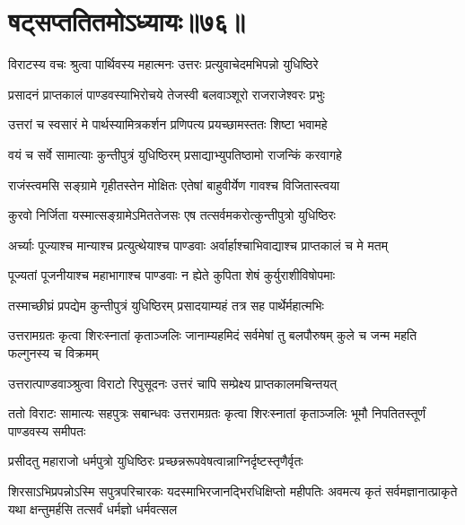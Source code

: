 \chapter{षट्सप्ततितमोऽध्यायः॥७६॥}

\twolineshloka
{विराटस्य वचः श्रुत्वा पार्थिवस्य महात्मनः}
{उत्तरः प्रत्युवाचेदमभिपन्नो युधिष्ठिरे}


\twolineshloka
{प्रसादनं प्राप्तकालं पाण्डवस्याभिरोचये}
{तेजस्वी बलवाञ्शूरो राजराजेश्वरः प्रभुः}


\twolineshloka
{उत्तरां च स्वसारं मे पार्थस्यामित्रकर्शन}
{प्रणिपत्य प्रयच्छामस्ततः शिष्टा भवामहे}



\twolineshloka
{वयं च सर्वे सामात्याः कुन्तीपुत्रं युधिष्ठिरम्}
{प्रसाद्याभ्युपतिष्ठामो राजन्किं करवागहे}


\twolineshloka
{राजंस्त्वमसि सङ्ग्रामे गृहीतस्तेन मोक्षितः}
{एतेषां बाहुवीर्येण गावश्च विजितास्त्वया}


\twolineshloka
{कुरवो निर्जिता यस्मात्सङ्ग्रामेऽमिततेजसः}
{एष तत्सर्वमकरोत्कुन्तीपुत्रो युधिष्ठिरः}


\twolineshloka
{अर्च्याः पूज्याश्च मान्याश्च प्रत्युत्थेयाश्च पाण्डवाः}
{अर्वार्हाश्चाभिवाद्याश्च प्राप्तकालं च मे मतम्}


\twolineshloka
{पूज्यतां पूजनीयाश्च महाभागाश्च पाण्डवाः}
{न ह्येते कुपिता शेषं कुर्युराशीविषोपमाः}


\twolineshloka
{तस्माच्छीघ्रं प्रपद्येम कुन्तीपुत्रं युधिष्ठिरम्}
{प्रसादयाम्यहं तत्र सह पार्थेर्महात्मभिः}


\threelineshloka
{उत्तरामग्रतः कृत्वा शिरःस्नातां कृताञ्जलिः}
{जानाम्यहमिदं सर्वमेषां तु बलपौरुषम्}
{कुले च जन्म महति फल्गुनस्य च विक्रमम्}




\twolineshloka
{उत्तरात्पाण्डवाञ्श्रुत्वा विराटो रिपुसूदनः}
{उत्तरं चापि सम्प्रेक्ष्य प्राप्तकालमचिन्तयत्}


\threelineshloka
{ततो विराटः सामात्यः सहपुत्रः सबान्धवः}
{उत्तरामग्रतः कृत्वा शिरःस्नातां कृताञ्जलिः}
{भूमौ निपतितस्तूर्णं पाण्डवस्य समीपतः}




\twolineshloka
{प्रसीदतु महाराजो धर्मपुत्रो युधिष्ठिरः}
{प्रच्छन्नरूपवेषत्वान्नाग्निर्दृष्टस्तृणैर्वृतः}


\onelineshloka
{शिरसाऽभिप्रपन्नोऽस्मि सपुत्रपरिचारकः}
\threelineshloka
{यदस्माभिरजानद्भिरधिक्षिप्तो महीपतिः}
{अवमत्य कृतं सर्वमज्ञानात्प्राकृते यथा}
{क्षन्तुमर्हसि तत्सर्वं धर्मज्ञो धर्मवत्सल}


